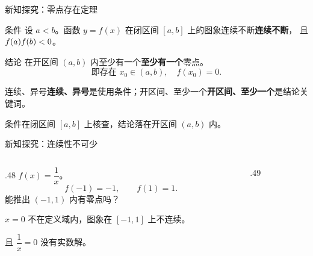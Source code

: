 \documentclass[aspectratio=169,10pt,handout]{beamer}
\newcommand{\key}[1]{{\ifmmode#1\else\bfseries #1\fi}}
\newcommand{\src}[1]{\par\vfill{\color{gray}\scriptsize #1}\par}
\newcommand{\gap}{\par\vspace{2mm}}
\begin{document}
\begin{frame}[t]{新知探究：零点存在定理}
  \large
  \begin{block}{条件}
    设 $a<b$。函数 $y=f(x)$ 在闭区间 $[a,b]$ 上的图象\key{连续不断}，
    且 $\key{f(a)f(b)<0}$。
  \end{block}
  \pause
  \begin{block}{结论}
    在开区间 $(a,b)$ 内\key{至少有一个}零点。
    \[\text{即存在 }x_0\in(a,b),\quad f(x_0)=0.\]
  \end{block}
  \pause
  \gap
  \key{连续、异号}是使用条件；\key{开区间、至少一个}是结论关键词。
  \src{条件在闭区间 $[a,b]$ 上核查，结论落在开区间 $(a,b)$ 内。}
\end{frame}

\begin{frame}[t]{新知探究：连续性不可少}
  \begin{columns}[T,onlytextwidth]
  \begin{column}{.48\textwidth}
    \large $f(x)=\dfrac1x$。
    \[f(-1)=-1,\qquad f(1)=1.\]
    能推出 $(-1,1)$ 内有零点吗？
    \pause
    \gap\key{不能。}
    \gap $x=0$ 不在定义域内，图象在 $[-1,1]$ 上不连续。
    \gap 且 $\dfrac1x=0$ 没有实数解。
  \end{column}
  \begin{column}{.49\textwidth}
    \centering
  \end{column}
  \end{columns}
\end{frame}
\end{document}
